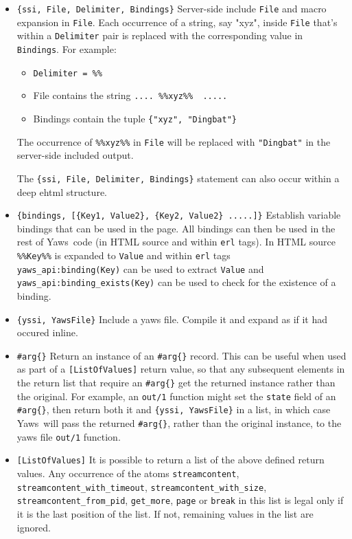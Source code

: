 \documentclass[11pt,oneside,english]{book}
\newcommand{\Yaws}            %
        {{\sc Yaws}}
\begin{document}
\begin{itemize}
\item \verb+{ssi, File, Delimiter, Bindings}+ Server-side include \verb+File+ and
  macro expansion in \verb+File+. Each occurrence of a string, say "xyz", inside
  \verb+File+ that's within a \verb+Delimiter+ pair is replaced with the
  corresponding value in \verb+Bindings+. For example:

   \begin{itemize}
     \item \verb+Delimiter = %%+

     \item File contains the string \verb+.... %%xyz%%  .....+

     \item Bindings contain the tuple \verb+{"xyz", "Dingbat"}+
   \end{itemize}

  The occurrence of \verb+%%xyz%%+ in \verb+File+ will be replaced with
  \verb+"Dingbat"+ in the server-side included output.

  The \verb+{ssi, File, Delimiter, Bindings}+ statement can also occur
  within a deep ehtml structure.


\item \verb+{bindings, [{Key1, Value2}, {Key2, Value2} .....]}+ Establish variable
  bindings that can be used in the page. All bindings can then be used in the
  rest of \Yaws\ code (in HTML source and within \verb+erl+ tags).
  In HTML source \verb+%%Key%%+ is expanded to \verb+Value+ and within \verb+erl+ tags \\
  \verb+yaws_api:binding(Key)+ can be used to extract \verb+Value+
  and \verb+yaws_api:binding_exists(Key)+ can be used to check for
  the existence of a binding.

\item \verb+{yssi, YawsFile}+ Include a yaws file. Compile it and expand as if it had
occured inline.

\item \verb+#arg{}+
Return an instance of an \verb+#arg{}+ record. This can be useful when used
as part of a \verb+[ListOfValues]+ return value, so that any subsequent
elements in the return list that require an \verb+#arg{}+ get the returned
instance rather than the original. For example, an \verb+out/1+ function
might set the \verb+state+ field of an \verb+#arg{}+, then return both it and
\verb+{yssi, YawsFile}+ in a list, in which case \Yaws\ will pass the returned
\verb+#arg{}+, rather than the original instance, to the yaws file
\verb+out/1+ function.

\item \verb+[ListOfValues]+ It is possible to return a list of the above defined
  return values. Any occurrence of the atoms \verb+streamcontent+,
  \verb+streamcontent_with_timeout+,
  \verb+streamcontent_with_size+,\\
  \verb+streamcontent_from_pid+, \verb+get_more+, \verb+page+ or \verb+break+ in
  this list is legal only if it is the last position of the list. If not,
  remaining values in the list are ignored.

\end{itemize}
\end{document}
